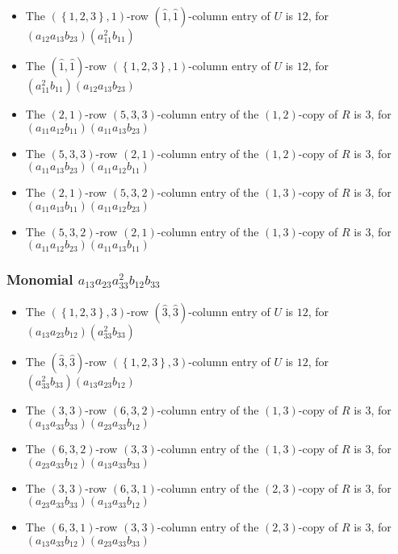 \documentclass{article}
\begin{document}
\begin{itemize}
\item The $ \left(\left\{1, 2, 3\right\}, 1\right) $-row $ (\hat{1}, \hat{1}) $-column entry of $U$ is $ 12 $, for $( a_{12} a_{13} b_{23} )( a_{11}^{2} b_{11} )$ 
\item The $(\hat{1}, \hat{1})$-row $ \left(\left\{1, 2, 3\right\}, 1\right) $-column entry of $U$ is $ 12 $, for $( a_{11}^{2} b_{11} )( a_{12} a_{13} b_{23} )$ 
\item The $(2, 1)$-row $(5, 3, 3)$-column entry of the $ \left(1, 2\right) $-copy of $R$ is $ 3 $, for $( a_{11} a_{12} b_{11} )( a_{11} a_{13} b_{23} )$ 
\item The $(5, 3, 3)$-row $(2, 1)$-column entry of the $ \left(1, 2\right) $-copy of $R$ is $ 3 $, for $( a_{11} a_{13} b_{23} )( a_{11} a_{12} b_{11} )$ 
\item The $(2, 1)$-row $(5, 3, 2)$-column entry of the $ \left(1, 3\right) $-copy of $R$ is $ 3 $, for $( a_{11} a_{13} b_{11} )( a_{11} a_{12} b_{23} )$ 
\item The $(5, 3, 2)$-row $(2, 1)$-column entry of the $ \left(1, 3\right) $-copy of $R$ is $ 3 $, for $( a_{11} a_{12} b_{23} )( a_{11} a_{13} b_{11} )$ 
\end{itemize}
\subsubsection{Monomial $ a_{13} a_{23} a_{33}^{2} b_{12} b_{33} $}

\begin{itemize}
\item The $ \left(\left\{1, 2, 3\right\}, 3\right) $-row $ (\hat{3}, \hat{3}) $-column entry of $U$ is $ 12 $, for $( a_{13} a_{23} b_{12} )( a_{33}^{2} b_{33} )$ 
\item The $(\hat{3}, \hat{3})$-row $ \left(\left\{1, 2, 3\right\}, 3\right) $-column entry of $U$ is $ 12 $, for $( a_{33}^{2} b_{33} )( a_{13} a_{23} b_{12} )$ 
\item The $(3, 3)$-row $(6, 3, 2)$-column entry of the $ \left(1, 3\right) $-copy of $R$ is $ 3 $, for $( a_{13} a_{33} b_{33} )( a_{23} a_{33} b_{12} )$ 
\item The $(6, 3, 2)$-row $(3, 3)$-column entry of the $ \left(1, 3\right) $-copy of $R$ is $ 3 $, for $( a_{23} a_{33} b_{12} )( a_{13} a_{33} b_{33} )$ 
\item The $(3, 3)$-row $(6, 3, 1)$-column entry of the $ \left(2, 3\right) $-copy of $R$ is $ 3 $, for $( a_{23} a_{33} b_{33} )( a_{13} a_{33} b_{12} )$ 
\item The $(6, 3, 1)$-row $(3, 3)$-column entry of the $ \left(2, 3\right) $-copy of $R$ is $ 3 $, for $( a_{13} a_{33} b_{12} )( a_{23} a_{33} b_{33} )$ 
\end{itemize}
\end{document}
